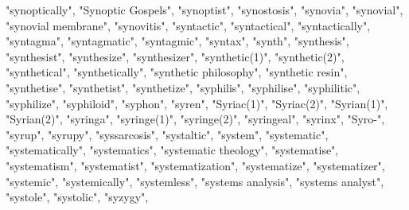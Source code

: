 "synoptically",
"Synoptic Gospels",
"synoptist",
"synostosis",
"synovia",
"synovial",
"synovial membrane",
"synovitis",
"syntactic",
"syntactical",
"syntactically",
"syntagma",
"syntagmatic",
"syntagmic",
"syntax",
"synth",
"synthesis",
"synthesist",
"synthesize",
"synthesizer",
"synthetic(1)",
"synthetic(2)",
"synthetical",
"synthetically",
"synthetic philosophy",
"synthetic resin",
"synthetise",
"synthetist",
"synthetize",
"syphilis",
"syphilise",
"syphilitic",
"syphilize",
"syphiloid",
"syphon",
"syren",
"Syriac(1)",
"Syriac(2)",
"Syrian(1)",
"Syrian(2)",
"syringa",
"syringe(1)",
"syringe(2)",
"syringeal",
"syrinx",
"Syro-",
"syrup",
"syrupy",
"syssarcosis",
"systaltic",
"system",
"systematic",
"systematically",
"systematics",
"systematic theology",
"systematise",
"systematism",
"systematist",
"systematization",
"systematize",
"systematizer",
"systemic",
"systemically",
"systemless",
"systems analysis",
"systems analyst",
"systole",
"systolic",
"syzygy",
